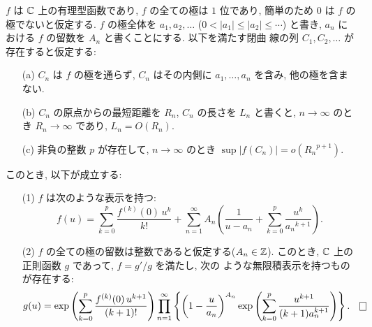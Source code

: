 \documentclass[12pt,twoside]{jarticle}
\def\Z{{\Bbb Z}} %
\def\C{{\Bbb C}} %
\begin{document}
\begin{question}[部分分数展開と無限乗積展開]\label{q:sum&prod}\qstar{*}
  $f$ は $\C$ 上の有理型函数であり, $f$ の全ての極は $1$ 位であり, %
  簡単のため $0$ は $f$ の極でないと仮定する. $f$ の極全体を %
  $a_1, a_2, \dots$ ($0<|a_1|\le|a_2|\le\cdots$) と書き, %
  $a_n$ における $f$ の留数を $A_n$ と書くことにする. 以下を満たす閉曲
  線の列 $C_1, C_2, \dots$ が存在すると仮定する:
  \begin{itemize}
  \item[(a)] $C_n$ は $f$ の極を通らず, $C_n$ はその内側に 
    $a_1,\dots,a_n$ を含み, 他の極を含まない.
  \item[(b)] $C_n$ の原点からの最短距離を $R_n$, $C_n$ の長さを $L_n$
    と書くと, $n\to\infty$ のとき $R_n\to\infty$ であり, $L_n=O(R_n)$.
  \item[(c)] 非負の整数 $p$ が存在して, $n\to\infty$ のとき 
    $\sup|f(C_n)| = o({R_n}^{p+1})$.
  \end{itemize}
  このとき, 以下が成立する:
  \begin{enumerate}
  \item[(1)] $f$ は次のような表示を持つ:
    \[
      f(u) = 
      \sum_{k=0}^{p} \frac{f^{(k)}(0)\,u^k}{k!}
      + \sum_{n=1}^\infty A_n
      \left(
        \frac{1}{u - a_n} +
        \sum_{k=0}^p\frac{u^k}{{a_n}^{k+1}}
      \right).
    \]
  \item[(2)] $f$ の全ての極の留数は整数であると仮定する($A_n\in\Z$). 
    このとき, $\C$ 上の正則函数 $g$ であって, $f=g'/g$ を満たし, 次の
    ような無限積表示を持つものが存在する:
    \[
      g(u) =
      \exp\left(
        \sum_{k=0}^{p} \frac{f^{(k)}(0)\,u^{k+1}}{(k+1)!}
      \right)
      \prod_{n=1}^\infty
      \left\{
        \left(1 - \frac{u}{a_n}\right)^{A_n}
        \exp\left( \sum_{k=0}^p \frac{u^{k+1}}{(k+1)a_n^{k+1}} \right)
      \right\}.
    \qed
    \]
  \end{enumerate}
\end{question}
\end{document}
